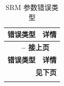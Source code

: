\documentclass[main\_\_CN.tex]{subfiles}
\begin{document}
\begin{longtable}[c]{ |p{6cm}|p{10cm}| }
    \caption{SRM 参数错误类型}
    \label{tab:srm_param_err}\\\hline

    \rowcolor{lightgray}
    \textbf{错误类型} & \textbf{详情} \\\hline
    \endfirsthead


    \multicolumn{2}{c}{\bfseries \tablename\ \thetable{} -- 接上页}\\\hline
    \rowcolor{lightgray}
    \textbf{错误类型} & \textbf{详情}  \\\hline
    \endhead

    \multicolumn{2}{r}{\textbf{见下页}} \\
    \endfoot

    \endlastfoot


\end{longtable}
\end{document}
